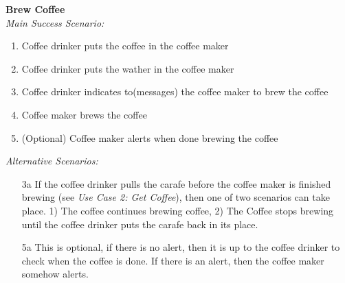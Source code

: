 \documentclass[letterpaper]{article}
\begin{document}
\noindent
\textbf{Brew Coffee}\\
\textit{Main Success Scenario:  }
\begin{enumerate}
   \item Coffee drinker puts the coffee in the coffee maker
   \item Coffee drinker puts the wather in the coffee maker
   \item Coffee drinker indicates to(messages) the coffee maker to
   brew the coffee
   \item Coffee maker brews the coffee
   \item (Optional) Coffee maker alerts when done brewing the coffee
\end{enumerate}
\textit{Alternative Scenarios:  }
\begin{enumerate}
\item[3a] If the coffee drinker pulls the carafe before the coffee
        maker is finished brewing (see \textit{Use Case 2:  Get
        Coffee}), then one of two scenarios can take place. 1) The 
        coffee continues brewing coffee, 2) The Coffee stops brewing
        until the coffee drinker puts the carafe back in its place.
\item[5a] This is optional, if there is no alert, then it is up to the
        coffee drinker to check when the coffee is done.  If there is
        an alert, then the coffee maker somehow alerts.
\end{enumerate}
\end{document}
